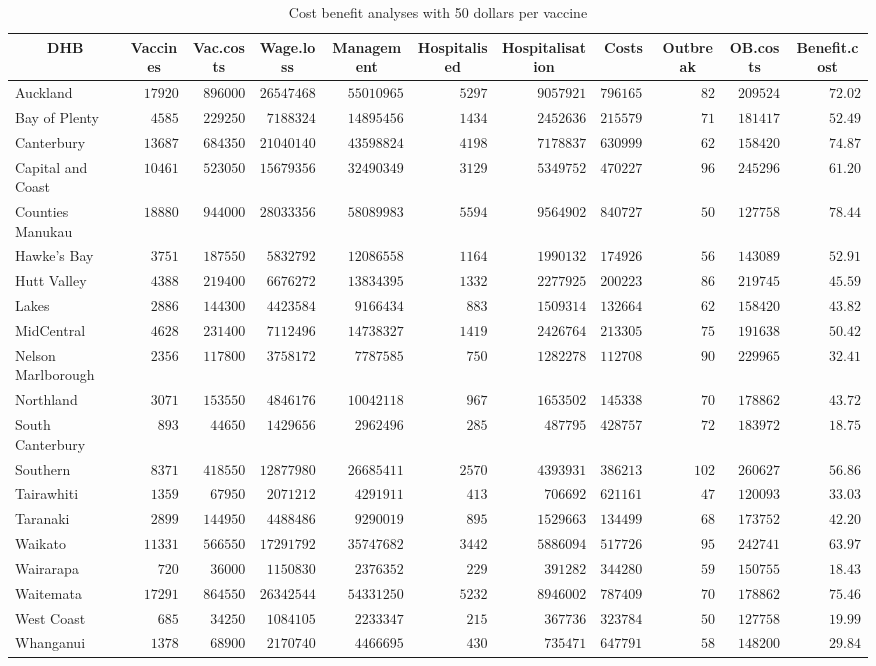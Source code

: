 \documentclass{article}
\begin{document}
\begin{table}\small
\caption{Cost benefit analyses with 50 dollars per vaccine}
\begin{center}
\begin{tabular}{lrrrrrrrrrr}
\hline\hline
\multicolumn{1}{c}{DHB}&\multicolumn{1}{c}{Vaccines}&\multicolumn{1}{c}{Vac.costs}&\multicolumn{1}{c}{Wage.loss}&\multicolumn{1}{c}{Management}&\multicolumn{1}{c}{Hospitalised}&\multicolumn{1}{c}{Hospitalisation}&\multicolumn{1}{c}{Costs}&\multicolumn{1}{c}{Outbreak}&\multicolumn{1}{c}{OB.costs}&\multicolumn{1}{c}{Benefit.cost}\tabularnewline
\hline
Auckland&$17920$&$896000$&$26547468$&$55010965$&$5297$&$9057921$&$79616516$&$ 82$&$209524$&$72.02$\tabularnewline
Bay of Plenty&$ 4585$&$229250$&$ 7188324$&$14895456$&$1434$&$2452636$&$21557962$&$ 71$&$181417$&$52.49$\tabularnewline
Canterbury&$13687$&$684350$&$21040140$&$43598824$&$4198$&$7178837$&$63099902$&$ 62$&$158420$&$74.87$\tabularnewline
Capital and Coast&$10461$&$523050$&$15679356$&$32490349$&$3129$&$5349752$&$47022778$&$ 96$&$245296$&$61.20$\tabularnewline
Counties Manukau&$18880$&$944000$&$28033356$&$58089983$&$5594$&$9564902$&$84072731$&$ 50$&$127758$&$78.44$\tabularnewline
Hawke's Bay&$ 3751$&$187550$&$ 5832792$&$12086558$&$1164$&$1990132$&$17492688$&$ 56$&$143089$&$52.91$\tabularnewline
Hutt Valley&$ 4388$&$219400$&$ 6676272$&$13834395$&$1332$&$2277925$&$20022305$&$ 86$&$219745$&$45.59$\tabularnewline
Lakes&$ 2886$&$144300$&$ 4423584$&$ 9166434$&$ 883$&$1509314$&$13266438$&$ 62$&$158420$&$43.82$\tabularnewline
MidCentral&$ 4628$&$231400$&$ 7112496$&$14738327$&$1419$&$2426764$&$21330552$&$ 75$&$191638$&$50.42$\tabularnewline
Nelson Marlborough&$ 2356$&$117800$&$ 3758172$&$ 7787585$&$ 750$&$1282278$&$11270851$&$ 90$&$229965$&$32.41$\tabularnewline
Northland&$ 3071$&$153550$&$ 4846176$&$10042118$&$ 967$&$1653502$&$14533802$&$ 70$&$178862$&$43.72$\tabularnewline
South Canterbury&$  893$&$ 44650$&$ 1429656$&$ 2962496$&$ 285$&$ 487795$&$ 4287574$&$ 72$&$183972$&$18.75$\tabularnewline
Southern&$ 8371$&$418550$&$12877980$&$26685411$&$2570$&$4393931$&$38621382$&$102$&$260627$&$56.86$\tabularnewline
Tairawhiti&$ 1359$&$ 67950$&$ 2071212$&$ 4291911$&$ 413$&$ 706692$&$ 6211616$&$ 47$&$120093$&$33.03$\tabularnewline
Taranaki&$ 2899$&$144950$&$ 4488486$&$ 9290019$&$ 895$&$1529663$&$13449923$&$ 68$&$173752$&$42.20$\tabularnewline
Waikato&$11331$&$566550$&$17291792$&$35747682$&$3442$&$5886094$&$51772645$&$ 95$&$242741$&$63.97$\tabularnewline
Wairarapa&$  720$&$ 36000$&$ 1150830$&$ 2376352$&$ 229$&$ 391282$&$ 3442806$&$ 59$&$150755$&$18.43$\tabularnewline
Waitemata&$17291$&$864550$&$26342544$&$54331250$&$5232$&$8946002$&$78740929$&$ 70$&$178862$&$75.46$\tabularnewline
West Coast&$  685$&$ 34250$&$ 1084105$&$ 2233347$&$ 215$&$ 367736$&$ 3237846$&$ 50$&$127758$&$19.99$\tabularnewline
Whanganui&$ 1378$&$ 68900$&$ 2170740$&$ 4466695$&$ 430$&$ 735471$&$ 6477915$&$ 58$&$148200$&$29.84$\tabularnewline
\hline
\end{tabular}\end{center}\label{table:cost50}
\end{table}
\end{document}
